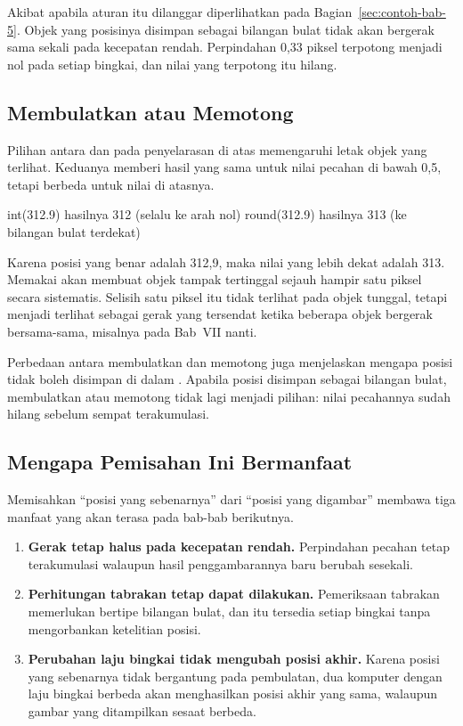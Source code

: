 Akibat apabila aturan itu dilanggar diperlihatkan pada
Bagian~\ref{sec:contoh-bab-5}. Objek yang posisinya disimpan sebagai bilangan
bulat tidak akan bergerak sama sekali pada kecepatan rendah. Perpindahan 0,33
piksel terpotong menjadi nol pada setiap bingkai, dan nilai yang terpotong itu
hilang.

\subsection{Membulatkan atau Memotong}

Pilihan antara  dan  pada penyelarasan di atas
memengaruhi letak objek yang terlihat. Keduanya memberi hasil yang sama untuk
nilai pecahan di bawah 0,5, tetapi berbeda untuk nilai di atasnya.

\begin{kodekeluaran}
int(312.9)      hasilnya 312      (selalu ke arah nol)
round(312.9)    hasilnya 313      (ke bilangan bulat terdekat)
\end{kodekeluaran}

Karena posisi yang benar adalah 312,9, maka nilai yang lebih dekat adalah 313.
Memakai  akan membuat objek tampak tertinggal sejauh hampir satu
piksel secara sistematis. Selisih satu piksel itu tidak terlihat pada objek
tunggal, tetapi menjadi terlihat sebagai gerak yang tersendat ketika beberapa
objek bergerak bersama-sama, misalnya pada Bab~VII nanti.

\begin{catatabox}
Perbedaan antara membulatkan dan memotong juga menjelaskan mengapa posisi
tidak boleh disimpan di dalam . Apabila posisi disimpan sebagai
bilangan bulat, membulatkan atau memotong tidak lagi menjadi pilihan: nilai
pecahannya sudah hilang sebelum sempat terakumulasi.
\end{catatabox}

\subsection{Mengapa Pemisahan Ini Bermanfaat}

Memisahkan ``posisi yang sebenarnya'' dari ``posisi yang digambar'' membawa
tiga manfaat yang akan terasa pada bab-bab berikutnya.

\begin{enumerate}
  \item \textbf{Gerak tetap halus pada kecepatan rendah.} Perpindahan pecahan
        tetap terakumulasi walaupun hasil penggambarannya baru berubah
        sesekali.
  \item \textbf{Perhitungan tabrakan tetap dapat dilakukan.} Pemeriksaan
        tabrakan memerlukan  bertipe bilangan bulat, dan
         itu tersedia setiap bingkai tanpa mengorbankan ketelitian
        posisi.
  \item \textbf{Perubahan laju bingkai tidak mengubah posisi akhir.} Karena
        posisi yang sebenarnya tidak bergantung pada pembulatan, dua komputer
        dengan laju bingkai berbeda akan menghasilkan posisi akhir yang sama,
        walaupun gambar yang ditampilkan sesaat berbeda.
\end{enumerate}
